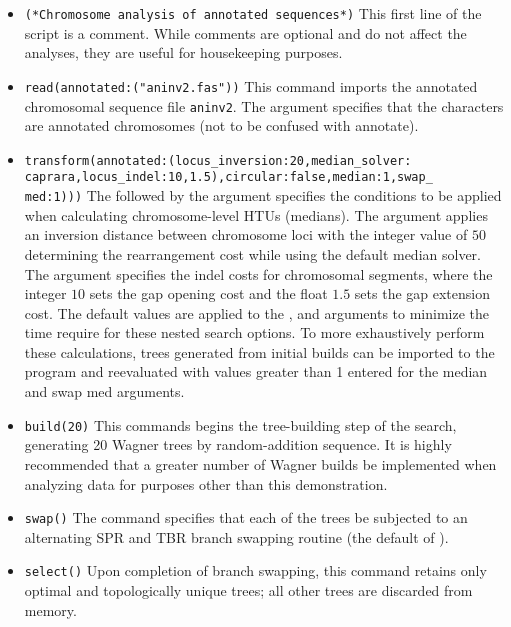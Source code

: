 \begin{itemize}
\item \texttt{(*Chromosome analysis of annotated sequences*)} This
first line of the script is a comment. While comments are optional
and do not affect the analyses, they are useful for housekeeping
purposes.  
\item \texttt{read(annotated:("aninv2.fas"))} This command
imports the annotated chromosomal sequence file \texttt{aninv2}.
The argument  specifies that the characters
are annotated chromosomes (not to be confused with \poyargument
{annotate}).  
\item \texttt{transform(annotated:(locus\_inversion:20,median\_solver:\\caprara,locus\_indel:10,1.5),circular:false,median:1,swap\_\\
med:1)))} The  followed by the argument
 specifies the conditions to be applied when
calculating chromosome-level HTUs (medians). The argument
 applies an inversion distance between
chromosome loci with the integer value  of $50$ determining the
rearrangement cost while using the default 
median solver. The argument  specifies
the indel costs for chromosomal segments, where the integer $10$
sets the gap opening cost and the float $1.5$ sets the gap extension
cost. The default values are applied to the ,
 and  arguments to
minimize the time require for these nested search options. To more
exhaustively perform these calculations, trees generated from initial
builds can be imported to the program and reevaluated with values
greater than 1 entered for the median and swap med arguments.  
\item \texttt{build(20)} This commands begins the tree-building step of
the search, generating 20 Wagner trees by random-addition sequence.
It is highly recommended that a greater number of Wagner builds be
implemented when analyzing data for purposes other than this
demonstration.  
\item \texttt{swap()} The  command
specifies that each of the trees be subjected to an alternating SPR
and TBR branch swapping routine (the default of \poy).  
\item \texttt{select()} Upon completion of branch swapping, this command
retains only optimal and topologically unique trees; all other trees
are discarded from memory.  

\end{itemize}
